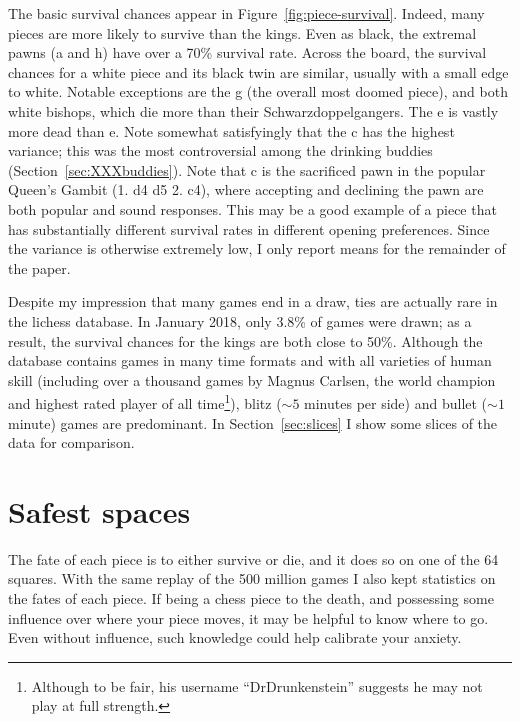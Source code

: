 \documentclass[twocolumn]{article}
\newcommand{\Pawn}[1][1.3ex]{%
\adjustbox{Trim=4.3pt 2.6pt 4.3pt 0pt,width=#1,margin=0.2ex 0ex 0.2ex 0ex}{\BlackPawnOnWhite}%
}%
\begin{document}
The basic survival chances appear in Figure~\ref{fig:piece-survival}.
Indeed, many pieces are more likely to survive than the kings. Even as
black, the extremal pawns (\pawn a and \pawn h) have over a 70\%
survival rate. Across the board, the survival chances for a white
piece and its black twin are similar, usually with a small edge to
white. Notable exceptions are the \knight g (the overall most doomed
piece), and both white bishops, which die more than their
Schwarzdoppelgangers. The \pawn e is vastly more dead than \Pawn e.
Note somewhat satisfyingly that the \pawn c has the highest variance;
this was the most controversial among the drinking buddies
(Section~\ref{sec:XXXbuddies}). Note that \pawn c is the sacrificed
pawn in the popular Queen's Gambit (1. d4 d5 2. c4), where accepting
and declining the pawn are both popular and sound responses. This may
be a good example of a piece that has substantially different survival
rates in different opening preferences. Since the variance is
otherwise extremely low, I only report means for the remainder of the
paper.

Despite my impression that many games end in a draw, ties are actually
rare in the lichess database. In January 2018, only 3.8\% of games
were drawn;
as a result, the survival chances for the kings are both close to
50\%. Although the database contains games in many time formats and
with all varieties of human skill (including over a thousand games by
Magnus Carlsen, the world champion and highest rated player of all
time\footnote{Although to be fair, his username ``DrDrunkenstein''
  suggests he may not play at full strength.}), blitz ($\sim 5$ minutes
per side) and bullet ($\sim 1$ minute) games are predominant. In
Section~\ref{sec:slices} I show some slices of the data for
comparison. %

\section{Safest spaces}

The fate of each piece is to either survive or die, and it does so on
one of the 64 squares. With the same replay of the 500 million games
I also kept statistics on the fates of each piece. If being a chess
piece to the death, and possessing some influence over where your piece
moves, it may be helpful to know where to go. Even without influence,
such knowledge could help calibrate your anxiety.
\end{document}
